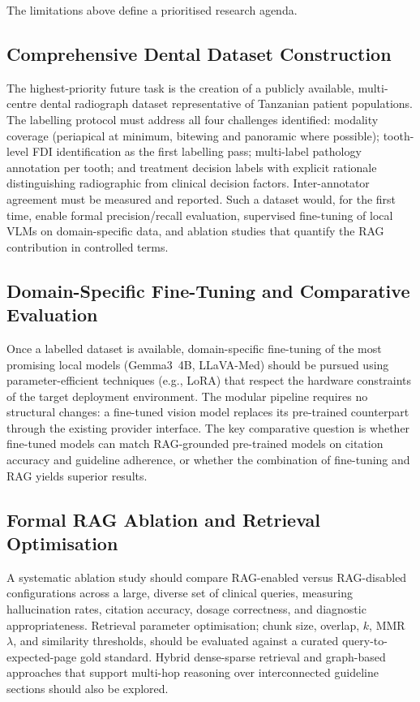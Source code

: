 \documentclass[12pt,a4paper]{report}
\begin{document}
	The limitations above define a prioritised research agenda.
	
	\subsection{Comprehensive Dental Dataset Construction}
	
	The highest-priority future task is the creation of a publicly available,
	multi-centre dental radiograph dataset representative of Tanzanian patient
	populations. The labelling protocol must address all four challenges identified:
	modality coverage (periapical at minimum, bitewing and panoramic where possible);
	tooth-level FDI identification as the first labelling pass; multi-label
	pathology annotation per tooth; and treatment decision labels with explicit
	rationale distinguishing radiographic from clinical decision factors.
	Inter-annotator agreement must be measured and reported. Such a dataset would,
	for the first time, enable formal precision/recall evaluation, supervised
	fine-tuning of local VLMs on domain-specific data, and ablation studies that
	quantify the RAG contribution in controlled terms.
	
	\subsection{Domain-Specific Fine-Tuning and Comparative Evaluation}
	
	Once a labelled dataset is available, domain-specific fine-tuning of the most
	promising local models (Gemma3~4B, LLaVA-Med) should be pursued using
	parameter-efficient techniques (e.g., LoRA) that respect the hardware constraints
	of the target deployment environment. The modular pipeline requires no structural
	changes: a fine-tuned vision model replaces its pre-trained counterpart through
	the existing provider interface. The key comparative question is whether
	fine-tuned models can match RAG-grounded pre-trained models on citation accuracy
	and guideline adherence, or whether the combination of fine-tuning and RAG
	yields superior results.
	
	\subsection{Formal RAG Ablation and Retrieval Optimisation}
	
	A systematic ablation study should compare RAG-enabled versus RAG-disabled
	configurations across a large, diverse set of clinical queries, measuring
	hallucination rates, citation accuracy, dosage correctness, and diagnostic
	appropriateness. Retrieval parameter optimisation; chunk size, overlap,
	$k$, MMR $\lambda$, and similarity thresholds, should be evaluated against
	a curated query-to-expected-page gold standard. Hybrid dense-sparse retrieval
	and graph-based approaches that support multi-hop reasoning over interconnected
	guideline sections should also be explored.
	
\end{document}
